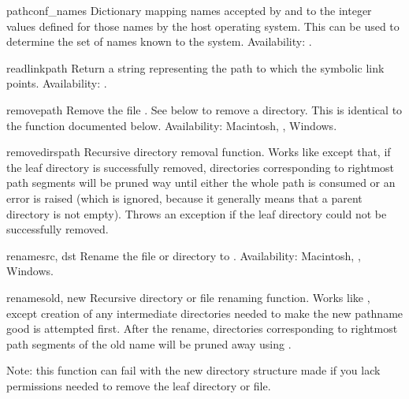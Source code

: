 \begin{datadesc}{pathconf_names}
Dictionary mapping names accepted by  and
 to the integer values defined for those names
by the host operating system.  This can be used to determine the set
of names known to the system.
Availability: \UNIX.
\end{datadesc}

\begin{funcdesc}{readlink}{path}
Return a string representing the path to which the symbolic link
points.
Availability: \UNIX{}.
\end{funcdesc}

\begin{funcdesc}{remove}{path}
Remove the file .  See  below to remove a
directory.  This is identical to the  function
documented below.
Availability: Macintosh, \UNIX{}, Windows.
\end{funcdesc}

\begin{funcdesc}{removedirs}{path}
Recursive directory removal function.  Works like
 except that, if the leaf directory is
successfully removed, directories corresponding to rightmost path
segments will be pruned way until either the whole path is consumed or
an error is raised (which is ignored, because it generally means that
a parent directory is not empty).  Throws an 
exception if the leaf directory could not be successfully removed.
\end{funcdesc}

\begin{funcdesc}{rename}{src, dst}
Rename the file or directory  to .
Availability: Macintosh, \UNIX{}, Windows.
\end{funcdesc}

\begin{funcdesc}{renames}{old, new}
Recursive directory or file renaming function.
Works like , except creation of any intermediate
directories needed to make the new pathname good is attempted first.
After the rename, directories corresponding to rightmost path segments
of the old name will be pruned away using .

Note: this function can fail with the new directory structure made if
you lack permissions needed to remove the leaf directory or file.
\end{funcdesc}

